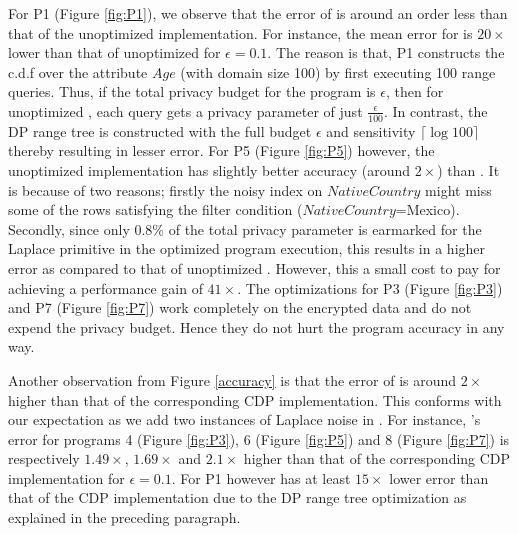 For P1 (Figure \ref{fig:P1}), we observe that the error of \system is around an order less than that of the unoptimized implementation. For instance, the mean error for \system is $20\times$ lower than that of unoptimized \system for $\epsilon=0.1$.  The reason is that, P1 constructs the c.d.f over the attribute $Age$ (with domain size 100) by first executing 100 range queries. %
Thus, if the total privacy budget for the program is $\epsilon$, then for unoptimized \system, each query gets a privacy parameter of just $\frac{\epsilon}{100}$. In contrast, the DP range tree is constructed with the full budget $\epsilon$ and sensitivity $\lceil\log 100\rceil$ thereby resulting in lesser error. For P5 (Figure \ref{fig:P5}) however, the unoptimized implementation has slightly better accuracy (around $2\times$) than \system. It is because of two reasons; firstly the noisy index on $NativeCountry$ might miss some of the rows satisfying the filter condition ($NativeCountry$=Mexico). Secondly, since only 0.8\% of the total privacy parameter is earmarked for the \textsf{Laplace} primitive in the optimized program execution, this results in a higher error as compared to that of unoptimized \system. However, this a small  cost to pay for achieving a performance gain of $41\times$. The optimizations for P3 (Figure \ref{fig:P3}) and P7 (Figure \ref{fig:P7}) work completely on the encrypted data and do not expend the privacy budget. Hence they do not hurt the program accuracy in any way.
 
 Another observation from Figure \ref{accuracy} is that the error of \system is around $2\times$ higher than that of the corresponding \textsf{CDP} implementation. This conforms with our expectation as we add two instances of Laplace noise in \system. For instance, \system's error for programs 4 (Figure \ref{fig:P3}), 6 (Figure \ref{fig:P5}) and 8 (Figure \ref{fig:P7})  is respectively $1.49\times$, $1.69 \times$ and $2.1\times$ higher  than that of the corresponding \textsf{CDP} implementation for $\epsilon=0.1$.  For P1 however \system has at least $15\times$ lower error than that of the \textsf{CDP} implementation due to the DP range tree optimization as explained in the preceding paragraph.
 

